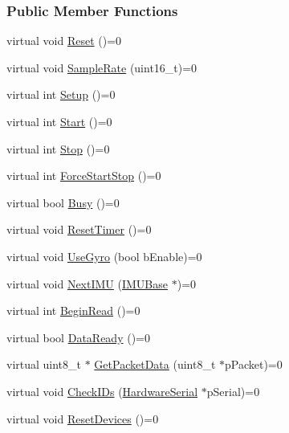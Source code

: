 \subsubsection*{Public Member Functions}
\begin{DoxyCompactItemize}
\item 
virtual void \hyperlink{class_i_m_u_base_a27fdd96992dfa8867943407fc400d071}{Reset} ()=0
\item 
virtual void \hyperlink{class_i_m_u_base_ad4f6b6562edc0e2b76591d0deca191d7}{SampleRate} (uint16\_\-t)=0
\item 
virtual int \hyperlink{class_i_m_u_base_a74d84beba0da335f49aa7ce94612cf13}{Setup} ()=0
\item 
virtual int \hyperlink{class_i_m_u_base_af31c2ed51cd36cc3230ebbb58757784a}{Start} ()=0
\item 
virtual int \hyperlink{class_i_m_u_base_a5b136166ec3849cbc1f93a13367eb08d}{Stop} ()=0
\item 
virtual int \hyperlink{class_i_m_u_base_a60bf7f5f9728d11bae5ca64bc7a9c10b}{ForceStartStop} ()=0
\item 
virtual bool \hyperlink{class_i_m_u_base_adb8539af8660d291fdde1f38b3d644f3}{Busy} ()=0
\item 
virtual void \hyperlink{class_i_m_u_base_a6e65b709e0212f95299ce9fa464b4651}{ResetTimer} ()=0
\item 
virtual void \hyperlink{class_i_m_u_base_a9b4cc325e9858a8bb204733dc7906ec2}{UseGyro} (bool bEnable)=0
\item 
virtual void \hyperlink{class_i_m_u_base_aa9c09bfd70f81b4a2df20cc5ae1474c3}{NextIMU} (\hyperlink{class_i_m_u_base}{IMUBase} $\ast$)=0
\item 
virtual int \hyperlink{class_i_m_u_base_a55327f28a0ad5e54d94f0c698b04827a}{BeginRead} ()=0
\item 
virtual bool \hyperlink{class_i_m_u_base_a53d56fa29c66935306e1dcca140aa9ff}{DataReady} ()=0
\item 
virtual uint8\_\-t $\ast$ \hyperlink{class_i_m_u_base_a13cf0868e2c3c31838fe889315ccfb0c}{GetPacketData} (uint8\_\-t $\ast$pPacket)=0
\item 
virtual void \hyperlink{class_i_m_u_base_ab920218bb6630f9e91ef7d0f07599203}{CheckIDs} (\hyperlink{class_hardware_serial}{HardwareSerial} $\ast$pSerial)=0
\item 
virtual void \hyperlink{class_i_m_u_base_a78622fbfb40a5bbee5e83bb8a0780d04}{ResetDevices} ()=0
\end{DoxyCompactItemize}


